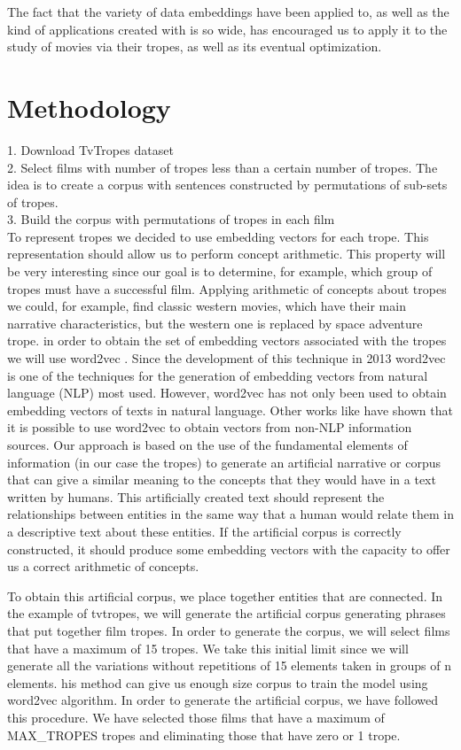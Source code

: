 \documentclass[letterpaper]{article}
\begin{document}
	The fact that the variety of data embeddings have been applied
	to, as well as the kind of applications created with is so
	wide, has encouraged us to apply it to the study of movies via
	their tropes, as well as its eventual optimization.
	
	\section{Methodology}
	\label{sec:met}
	
	1. Download TvTropes dataset \\
	2. Select films with number of tropes less than a certain number of tropes. The idea is to create a corpus with sentences constructed by permutations of sub-sets of tropes. \\
	3. Build the corpus with permutations of tropes in each film \\
	
	To represent tropes we decided to use embedding vectors for
	each trope. This representation should allow us to perform
	concept arithmetic. This property will be very interesting
	since our goal is to determine, for example, which group of
	tropes must have a successful film. Applying arithmetic of
	concepts about tropes we could, for example, find classic
	western movies, which have their main narrative
	characteristics, but the western one is replaced by space
	adventure trope. in order to obtain the set of embedding vectors
	associated with the tropes we will use word2vec
	\cite{mikolov2013}. Since the development of this technique in
	2013 word2vec is one of the techniques for the generation of
	embedding vectors from natural language (NLP) most
	used. However, word2vec has not only been used to obtain
	embedding vectors of texts in natural language. Other works
	like \cite{kazama2018} have shown that it is possible to use
	word2vec to obtain vectors from non-NLP information
	sources. Our approach is based on the use of the fundamental
	elements of information (in our case the tropes) to generate
	an artificial narrative or corpus that can give a similar
	meaning to the concepts that they would have in a text written
	by humans. This artificially created text should represent the
	relationships between entities in the same way that a human
	would relate them in a descriptive text about these
	entities. If the artificial corpus is correctly constructed,
	it should produce some embedding vectors with the capacity to
	offer us a correct arithmetic of concepts.
	
	To obtain this artificial corpus, we place together entities
	that are connected. In the example of tvtropes, we will
	generate the artificial corpus generating phrases that put
	together film tropes. In order to generate the corpus, we will
	select films that have a maximum of 15 tropes. We take this
	initial limit since we will generate all the variations
	without repetitions of 15 elements taken in groups of n
	elements. his method can give us enough size corpus to train
	the model using word2vec algorithm.
	In order to generate the artificial corpus, we have followed this procedure. We have selected those films that have a maximum of MAX\_TROPES tropes and eliminating those that have zero or 1 trope.  
\end{document}
